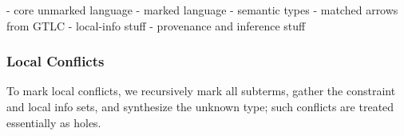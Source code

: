 \begin{mathpar}
\label{inf:lam-ana}


\end{mathpar}


- core unmarked language
- marked language
- semantic types
- matched arrows from GTLC
- local-info stuff
- provenance and inference stuff


\subsubsection{Local Conflicts}
To mark local conflicts, we recursively mark all subterms, gather the constraint and local info sets, and synthesize the unknown type; such conflicts are treated essentially as holes. 

